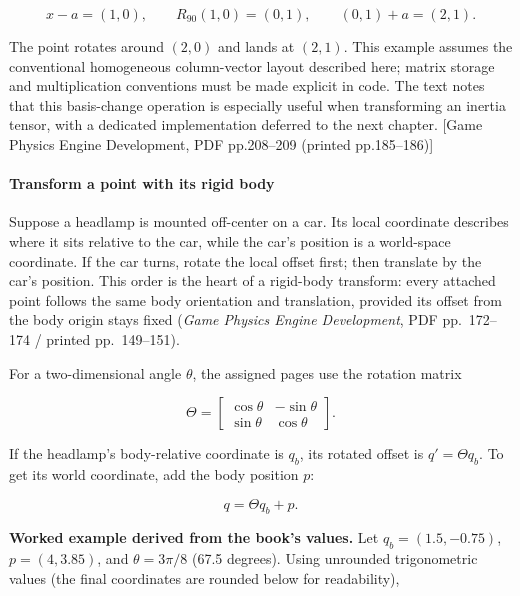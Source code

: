\[
x-a=(1,0),\qquad R_{90}(1,0)=(0,1),\qquad (0,1)+a=(2,1).
\]

The point rotates around \((2,0)\) and lands at \((2,1)\). This example assumes the conventional homogeneous column-vector layout described here; matrix storage and multiplication conventions must be made explicit in code. The text notes that this basis-change operation is especially useful when transforming an inertia tensor, with a dedicated implementation deferred to the next chapter. {[}Game Physics Engine Development, PDF pp.208--209 (printed pp.185--186){]}

\paragraph{Transform a point with its rigid body}\label{06-engine-ii-ch025-transform-a-point-with-its-rigid-body}

\hypertarget{06-engine-ii-ch025-transform-a-point-with-its-rigid-body}{}

Suppose a headlamp is mounted off-center on a car. Its local coordinate describes where it sits relative to the car, while the car's position is a world-space coordinate. If the car turns, rotate the local offset first; then translate by the car's position. This order is the heart of a rigid-body transform: every attached point follows the same body orientation and translation, provided its offset from the body origin stays fixed (\emph{Game Physics Engine Development}, PDF pp.~172--174 / printed pp.~149--151).

For a two-dimensional angle \(\theta\), the assigned pages use the rotation matrix

\[
\Theta = \begin{bmatrix}
\cos\theta & -\sin\theta \\
\sin\theta & \cos\theta
\end{bmatrix}.
\]

If the headlamp's body-relative coordinate is \(q_b\), its rotated offset is \(q' = \Theta q_b\). To get its world coordinate, add the body position \(p\):

\[
q = \Theta q_b + p.
\]

\textbf{Worked example derived from the book's values.} Let \(q_b = (1.5,-0.75)\), \(p=(4,3.85)\), and \(\theta=3\pi/8\) (67.5 degrees). Using unrounded trigonometric values (the final coordinates are rounded below for readability),

